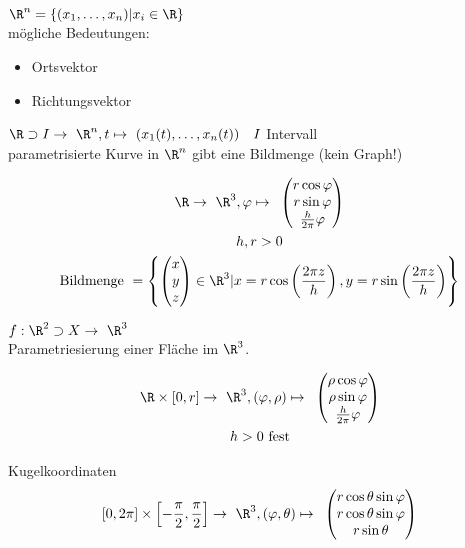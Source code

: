 $\R^n = \{ (x_1 , \dotsc , x_n ) | x_i \in \R \}$\\
mögliche Bedeutungen:
\begin{itemize}
	\item Ortsvektor
	\item Richtungsvektor
\end{itemize}

$\R \supset I \rightarrow \R^n , t \mapsto ( x_1(t) , \dotsc , x_n(t) ) \quad I$ Intervall\\
parametrisierte Kurve in $\R^n$ gibt eine Bildmenge (kein Graph!)\\
\begin{bsp*}[note = Schraubenlinie]
	\begin{gather*}
		\R \rightarrow \R^3 , \varphi \mapsto \begin{pmatrix}
			r \cos \varphi \\
			r \sin \varphi \\
			\frac{h}{2\pi} \varphi
		\end{pmatrix}\\
		h, r > 0 \\
		\text{Bildmenge } = \left\{ \begin{pmatrix}
			x \\
			y \\
			z
		\end{pmatrix} \in \R^3 | x = r \cos\left( \frac{2 \pi z}{h} \right) , y = r \sin\left( \frac{2 \pi z}{h} \right) \right\}
	\end{gather*}
\end{bsp*}

$f: \R^2 \supset X \rightarrow \R^3$\\
Parametriesierung einer Fläche im $\R^3$.\\
\begin{bsp*}
	\begin{gather*}
		\R \times [0,r] \rightarrow \R^3 , (\varphi , \rho) \mapsto \begin{pmatrix}
			\rho \cos \varphi \\
			\rho \sin \varphi \\
			\frac{h}{2 \pi} \varphi
		\end{pmatrix}\\
		h > 0 \text{ fest}
	\end{gather*}
\end{bsp*}
\begin{bsp*}[note = Kugeloberfläche mit Radius $r>0$]
	Kugelkoordinaten
	\[
		[0,2 \pi] \times \left[ -\frac{\pi}{2} , \frac{\pi}{2} \right] \rightarrow \R^3 , (\varphi , \theta ) \mapsto \begin{pmatrix}
			r \cos \theta \sin \varphi \\
			r \cos \theta \sin \varphi \\
			r \sin \theta
		\end{pmatrix}
	\]
\end{bsp*}

